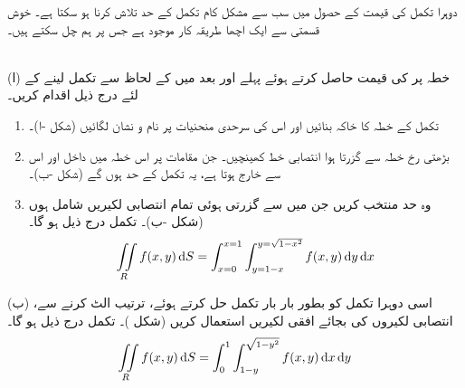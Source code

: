 دوہرا تکمل کی قیمت کے حصول میں سب سے مشکل کام تکمل کے حد تلاش کرنا ہو سکتا ہے۔ خوش قسمتی سے   ایک  اچھا  طریقہ کار موجود ہے جس پر ہم چل سکتے ہیں۔ 

\\
(ا)   خطہ  پر  کی قیمت حاصل کرتے ہوئے  پہلے  اور بعد میں  کے لحاظ سے تکمل لینے کے لئے درج ذیل اقدام کریں۔
\begin{enumerate}[1.]
\item
{}\quad
تکمل کے  خطہ کا خاکہ بنائیں اور اس کی سرحدی منحنیات   پر نام و نشان لگائیں (شکل -ا)۔
\item
{}\quad
بڑھتی  رخ خطہ  سے گزرتا ہوا انتصابی  خط  کھینچیں۔ جن مقامات  پر   اس خطہ میں داخل   اور اس سے     خارج ہوتا ہے، یہ تکمل کے  حد ہوں گے (شکل -ب)۔
\item
 \quad
وہ  حد منتخب کریں جن میں  سے گزرتی ہوئی تمام انتصابی  لکیریں شامل ہوں (شکل -ب)۔ تکمل درج ذیل ہو گا۔
\begin{align*}
\iint\limits_R f(x,y)\dif S=\int_{x=0}^{x=1}\int_{y=1-x}^{y=\sqrt{1-x^2}}f(x,y)\dif y\dif x
\end{align*}
\end{enumerate}

(ب) اسی دوہرا تکمل کو   بطور  بار بار تکمل حل کرتے ہوئے، ترتیب الٹ کرنے سے، انتصابی لکیروں کی بجائے  افقی لکیریں استعمال کریں (شکل )۔ تکمل درج ذیل ہو گا۔
\begin{align*}
\iint\limits_R f(x,y)\dif S=\int_0^1\int_{1-y}^{\sqrt{1-y^2}}f(x,y)\dif x\dif y
\end{align*} 

